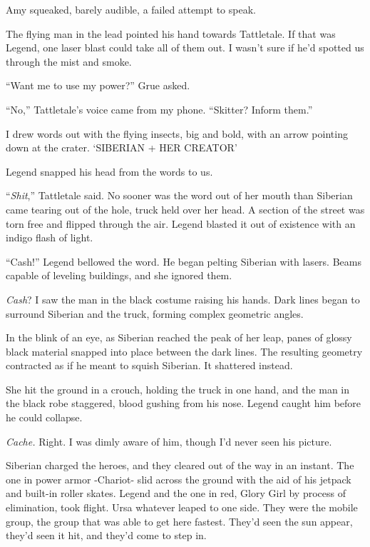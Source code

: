 Amy squeaked, barely audible, a failed attempt to speak.



The flying man in the lead pointed his hand towards Tattletale.  If that was Legend, one laser blast could take all of them out.  I wasn't sure if he'd spotted us through the mist and smoke.



``Want me to use my power?'' Grue asked.



``No,'' Tattletale's voice came from my phone.  ``Skitter?  Inform them.''



I drew words out with the flying insects, big and bold, with an arrow pointing down at the crater.  `SIBERIAN + HER CREATOR'



Legend snapped his head from the words to us.



``\emph{Shit},'' Tattletale said.  No sooner was the word out of her mouth than Siberian came tearing out of the hole, truck held over her head.  A section of the street was torn free and flipped through the air.  Legend blasted it out of existence with an indigo flash of light.



``Cash!''  Legend bellowed the word.  He began pelting Siberian with lasers.  Beams capable of leveling buildings, and she ignored them.



\emph{Cash}?  I saw the man in the black costume raising his hands.  Dark lines began to surround Siberian and the truck, forming complex geometric angles.



In the blink of an eye, as Siberian reached the peak of her leap, panes of glossy black material snapped into place between the dark lines.  The resulting geometry contracted as if he meant to squish Siberian.  It shattered instead.



She hit the ground in a crouch, holding the truck in one hand, and the man in the black robe staggered, blood gushing from his nose.  Legend caught him before he could collapse.



\emph{Cache.}  Right.  I was dimly aware of him, though I'd never seen his picture.



Siberian charged the heroes, and they cleared out of the way in an instant.  The one in power armor -Chariot- slid across the ground with the aid of his jetpack and built-in roller skates. Legend and the one in red, Glory Girl by process of elimination, took flight.  Ursa whatever leaped to one side.  They were the mobile group, the group that was able to get here fastest.  They'd seen the sun appear, they'd seen it hit, and they'd come to step in.



